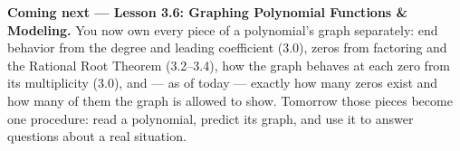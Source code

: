 \documentclass[10pt]{article}
\begin{document}
\begin{spiralbox}
\textbf{Coming next --- Lesson 3.6: Graphing Polynomial Functions \& Modeling.} You now own every
piece of a polynomial's graph separately: end behavior from the degree and leading coefficient
(3.0), zeros from factoring and the Rational Root Theorem (3.2--3.4), how the graph behaves at each
zero from its multiplicity (3.0), and --- as of today --- exactly how many zeros exist and how many of
them the graph is allowed to show. Tomorrow those pieces become one procedure: read a polynomial,
predict its graph, and use it to answer questions about a real situation.
\end{spiralbox}
\end{document}
